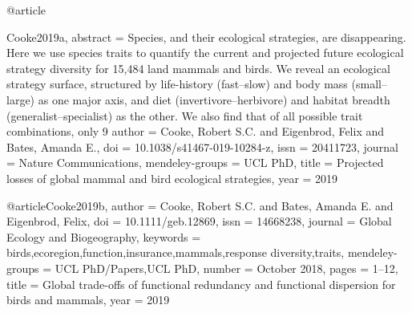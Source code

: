{{{{@article{Cooke2019a,
abstract = {Species, and their ecological strategies, are disappearing. Here we use species traits to quantify the current and projected future ecological strategy diversity for 15,484 land mammals and birds. We reveal an ecological strategy surface, structured by life-history (fast–slow) and body mass (small–large) as one major axis, and diet (invertivore–herbivore) and habitat breadth (generalist–specialist) as the other. We also find that of all possible trait combinations, only 9%
author = {Cooke, Robert S.C. and Eigenbrod, Felix and Bates, Amanda E.},
doi = {10.1038/s41467-019-10284-z},
issn = {20411723},
journal = {Nature Communications},
mendeley-groups = {UCL PhD},
title = {{Projected losses of global mammal and bird ecological strategies}},
year = {2019}
}

@article{Cooke2019b,
author = {Cooke, Robert S.C. and Bates, Amanda E. and Eigenbrod, Felix},
doi = {10.1111/geb.12869},
issn = {14668238},
journal = {Global Ecology and Biogeography},
keywords = {birds,ecoregion,function,insurance,mammals,response diversity,traits},
mendeley-groups = {UCL PhD/Papers,UCL PhD},
number = {October 2018},
pages = {1--12},
title = {{Global trade-offs of functional redundancy and functional dispersion for birds and mammals}},
year = {2019}
}

}}}}}
